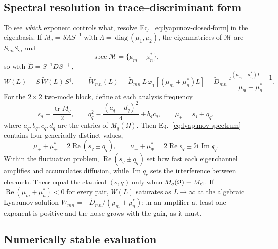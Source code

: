 \documentclass[11pt,a4paper]{article}
\newcommand{\ii}{\mathrm i}
\newcommand{\e}{\mathrm e}
\newcommand{\Rea}{\operatorname{Re}}
\newcommand{\Ima}{\operatorname{Im}}
\begin{document}
\subsection{Spectral resolution in trace--discriminant form}

To see \emph{which} exponent controls what, resolve
Eq.~\eqref{eq:lyapunov-closed-form} in the eigenbasis. If
$M_q=S\Lambda S^{-1}$ with $\Lambda=\operatorname{diag}(\mu_1,\mu_2)$, the
eigenmatrices of $\mathcal M$ are $S_{\cdot m}S_{\cdot n}^\dagger$ and
\begin{equation}
\operatorname{spec}\mathcal M=\{\mu_m+\mu_n^*\},
\label{eq:lyapunov-spectrum}
\end{equation}
so with $\widetilde D=S^{-1}DS^{-\dagger}$,
\begin{equation}
W(L)=S\,\widetilde W(L)\,S^\dagger,\qquad
\widetilde W_{mn}(L)=\widetilde D_{mn}\,
L\,\varphi_1\!\left[(\mu_m+\mu_n^*)L\right]
=\widetilde D_{mn}\,\frac{\e^{(\mu_m+\mu_n^*)L}-1}{\mu_m+\mu_n^*} .
\label{eq:lyapunov-eigenbasis}
\end{equation}
For the $2\times2$ two-mode block, define at each analysis frequency
\begin{equation}
s_q\equiv\frac{\operatorname{tr}M_q}{2},\qquad
q_q^2\equiv\frac{(a_q-d_q)^2}{4}+b_qc_q,\qquad
\mu_\pm=s_q\pm q_q ,
\label{eq:Mq-eigenvalues}
\end{equation}
where $a_q,b_q,c_q,d_q$ are the entries of $M_q(\Omega)$. Then
Eq.~\eqref{eq:lyapunov-spectrum} contains four generically distinct values,
\begin{equation}
\mu_\pm+\mu_\pm^*=2\Rea(s_q\pm q_q),\qquad
\mu_\pm+\mu_\mp^*=2\Rea s_q\pm2\ii\,\Ima q_q .
\label{eq:lyapunov-denominators}
\end{equation}
Within the fluctuation problem, $\Rea(s_q\pm q_q)$ set how fast each
eigenchannel amplifies and accumulates diffusion, while $\Ima q_q$ sets the
interference between channels. These equal the classical $(s,q)$ only when
$M_q(\Omega)=M_{\rm cl}$. If $\Rea(\mu_m+\mu_n^*)<0$ for every pair,
$W(L)$ saturates as $L\to\infty$ at the algebraic Lyapunov solution
$\widetilde W_{mn}=-\widetilde D_{mn}/(\mu_m+\mu_n^*)$; in an amplifier at
least one exponent is positive and the noise grows with the gain, as it must.

\subsection{Numerically stable evaluation}
\label{sec:lyapunov-robust}
\end{document}
